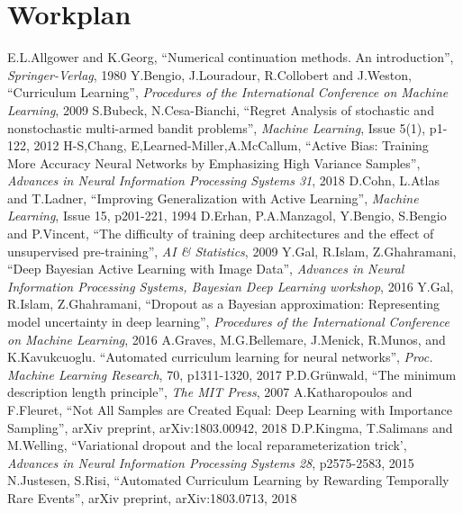 \documentclass[a4paper,10.5pt]{article}
\begin{document}
\section{Workplan}

\newpage

\begin{thebibliography}{1}
E.L.Allgower and K.Georg, ``Numerical continuation methods. An introduction'', \textit{Springer-Verlag}, 1980
Y.Bengio, J.Louradour, R.Collobert and J.Weston, ``Curriculum Learning'', \textit{Procedures of the International Conference on Machine Learning}, 2009
S.Bubeck, N.Cesa-Bianchi, ``Regret Analysis of stochastic and nonstochastic multi-armed bandit problems'', \textit{Machine Learning}, Issue 5(1), p1-122, 2012
H-S,Chang, E,Learned-Miller,A.McCallum, ``Active Bias: Training More Accuracy Neural Networks by Emphasizing High Variance Samples'', \textit{Advances in Neural Information Processing Systems 31}, 2018
D.Cohn, L.Atlas and T.Ladner, ``Improving Generalization with Active Learning'', \textit{Machine Learning}, Issue 15, p201-221, 1994
D.Erhan, P.A.Manzagol, Y.Bengio, S.Bengio and P.Vincent, ``The difficulty of training deep architectures and the effect of unsupervised pre-training'', \textit{AI \& Statistics}, 2009
Y.Gal, R.Islam, Z.Ghahramani, ``Deep Bayesian Active Learning with Image Data'', \textit{Advances in Neural Information Processing Systems, Bayesian Deep Learning workshop}, 2016
Y.Gal, R.Islam, Z.Ghahramani, ``Dropout as a Bayesian approximation: Representing model uncertainty in deep learning'', \textit{Procedures of the International Conference on Machine Learning}, 2016
A.Graves, M.G.Bellemare, J.Menick, R.Munos, and K.Kavukcuoglu. ``Automated curriculum learning for neural networks'', \textit{Proc. Machine Learning Research}, 70, p1311-1320, 2017
P.D.Gr{\"u}nwald, ``The minimum description length principle'', \textit{The MIT Press}, 2007
A.Katharopoulos and F.Fleuret, ``Not All Samples are Created Equal: Deep Learning with Importance Sampling'', arXiv preprint, arXiv:1803.00942, 2018
D.P.Kingma, T.Salimans and M.Welling, ``Variational dropout and the local reparameterization trick', \textit{Advances in Neural Information Processing Systems 28}, p2575-2583, 2015
N.Justesen, S.Risi, ``Automated Curriculum Learning by Rewarding Temporally Rare Events'', arXiv preprint, arXiv:1803.0713, 2018

\end{thebibliography}
\end{document}
